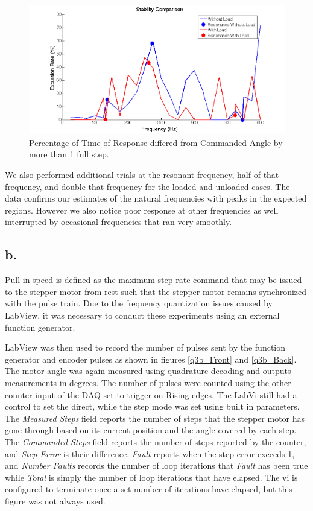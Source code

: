 \documentclass{article}
\theoremstyle{plain}
\theoremstyle{definition}
\theoremstyle{remark}
\begin{document}
\begin{figure}[hbt]
\begin{center}
\includegraphics[width = 15cm]{ResonanceData.png}
\caption{Percentage of Time of Response differed from Commanded Angle by more than 1 full step.}
\label{q3aii}
\end{center}
\end{figure}

We also performed additional trials at the resonant frequency, half of that frequency, and double that frequency for the loaded and unloaded cases.  The data confirms our estimates of the natural frequencies with peaks in the expected regions.  However we also notice poor response at other frequencies as well interrupted by occasional frequencies that ran very smoothly. 

\clearpage

\subsection*{b.}

Pull-in speed is defined as the maximum step-rate command that may be issued to the stepper motor from rest such that the stepper motor remains synchronized with the pulse train.  Due to the frequency quantization issues caused by LabView, it was necessary to conduct these experiments using an external function generator.  

LabView was then used to record the number of pulses sent by the function generator and encoder pulses as shown in figures \ref{q3b_Front} and \ref{q3b_Back}.  The motor angle was again measured using quadrature decoding and outputs measurements in degrees.  The number of pulses were counted using the other counter input of the DAQ set to trigger on Rising edges.  The LabVi still had a control to set the direct, while the step mode was set using built in parameters.  The \emph{Measured Steps} field reports the number of steps that the stepper motor has gone through based on its current position and the angle covered by each step.  The \emph{Commanded Steps} field reports the number of steps reported by the counter, and \emph{Step Error} is their difference.  \emph{Fault} reports when the step error exceeds 1, and \emph{Number Faults} records the number of loop iterations that \emph{Fault} has been true while \emph{Total} is simply the number of loop iterations that have elapsed. The vi is configured to terminate once a set number of iterations have elapsed, but this figure was not always used.  
\end{document}
